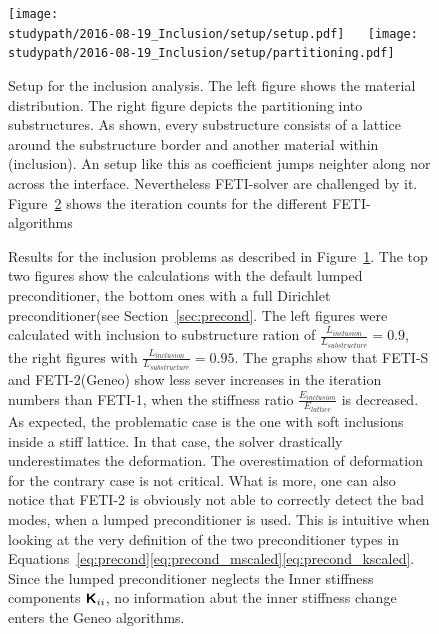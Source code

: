 \begin{figure}[tb]
  \begin{center}
    \texttt{[image: \\studypath/2016-08-19\_Inclusion/setup/setup.pdf]}~
    \hspace{1cm}~
    \texttt{[image: \\studypath/2016-08-19\_Inclusion/setup/partitioning.pdf]}
    \caption[Study of inclusion handling: setup]{Setup for the inclusion analysis. The left figure shows the material distribution. The right figure depicts the partitioning into substructures. As shown, every substructure consists of a lattice around the substructure border and another material within (inclusion). An setup like this as coefficient jumps neighter along nor across the interface. Nevertheless FETI-solver are challenged by it. Figure~\ref{fig:results_inclusion_problem} shows the iteration counts for the different FETI-algorithms}
    \label{fig:setup_inclusion_problem}
  \end{center}
\end{figure}	

\begin{figure}[tb]
  \begin{center}
    
    \caption[Study of inclusion handling: \# iterations]{Results for the inclusion problems as described in Figure~\ref{fig:setup_inclusion_problem}. The top two figures show the calculations with the default lumped preconditioner, the bottom ones with a full Dirichlet preconditioner(see Section~\ref{sec:precond}. The left figures were calculated with inclusion to substructure ration of $\frac{L_{inclusion}}{L_{substructure}}=0.9$, the right figures with $\frac{L_{inclusion}}{L_{substructure}}=0.95$.  The graphs show that FETI-S and FETI-2(Geneo) show less sever increases in the iteration numbers than FETI-1, when the stiffness ratio $\frac{E_{inclusion}}{E_{lattice}}$ is decreased. As expected, the problematic case is the one with soft inclusions inside a stiff lattice. In that case, the solver drastically underestimates the deformation. The overestimation of deformation for the contrary case is not critical. What is more, one can also notice that FETI-2 is obviously not able to correctly detect the bad modes, when a lumped preconditioner is used. This is intuitive when looking at the very definition of the two preconditioner types in Equations~\eqref{eq:precond}\eqref{eq:precond_mscaled}\eqref{eq:precond_kscaled}. Since the lumped preconditioner neglects the Inner stiffness components $\boldsymbol{\mathsf{K}}_{ii}$, no information abut the inner stiffness change enters the Geneo algorithms.}
    \label{fig:results_inclusion_problem}
  \end{center}
\end{figure}

